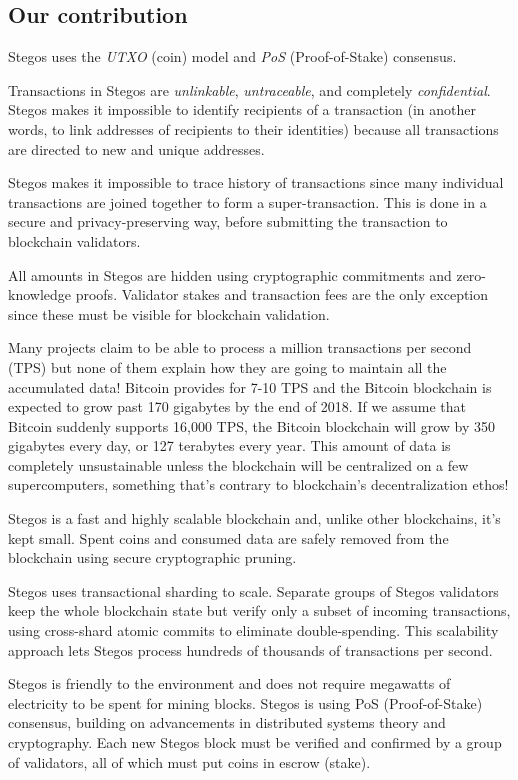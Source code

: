 \documentclass[a4paper, 10pt, conference]{ieeeconf}
\begin{document}
\subsection{Our contribution}

Stegos uses the \textit{UTXO} (coin) model and \textit{PoS} (Proof-of-Stake) consensus.

Transactions in Stegos are \textit{unlinkable}, \textit{untraceable}, and completely \textit{confidential}. Stegos makes it impossible to identify recipients of a transaction (in another words, to link addresses of recipients to their identities) because all transactions are directed to new and unique addresses.

Stegos makes it impossible to trace history of transactions since many individual transactions are joined together to form a super-transaction. This is done in a secure and privacy-preserving way, before submitting the transaction to blockchain validators.

All amounts in Stegos are hidden using cryptographic commitments and zero-knowledge proofs. Validator stakes and transaction fees are the only exception since these must be visible for blockchain validation.

Many projects claim to be able to process a million transactions per second (TPS) but none of them explain how they are going to maintain all the accumulated data! Bitcoin provides for 7-10 TPS and the Bitcoin blockchain is expected to grow past 170 gigabytes by the end of 2018. If we assume that Bitcoin suddenly supports 16,000 TPS, the Bitcoin blockchain will grow by 350 gigabytes every day, or 127 terabytes every year. This amount of data is completely unsustainable unless the blockchain will be centralized on a few supercomputers, something that’s contrary to blockchain’s decentralization ethos!

Stegos is a fast and highly scalable blockchain and, unlike other blockchains, it’s kept small. Spent coins and consumed data are safely removed from the blockchain using secure cryptographic pruning. 

Stegos uses transactional sharding to scale. Separate gro\-ups of Stegos validators keep the whole blockchain state but verify only a subset of incoming transactions, using cross-shard atomic commits to eliminate double-spending. This scalability approach lets Stegos process hundreds of thousands of transactions per second.

Stegos is friendly to the environment and does not require megawatts of electricity to be spent for mining blocks. Stegos is using PoS (Proof-of-Stake) consensus, building on advancements in distributed systems theory and cryptography. Each new Stegos block must be verified and confirmed by a group of validators, all of which must put coins in escrow (stake).
\end{document}
